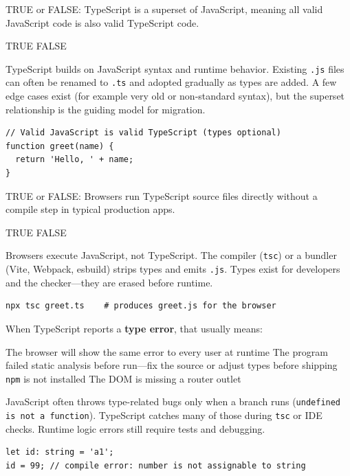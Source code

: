 


\question[4]
TRUE or FALSE: TypeScript is a superset of JavaScript, meaning all valid JavaScript code is also valid TypeScript code.
\begin{choices}
  \CorrectChoice TRUE
  \choice FALSE
\end{choices}
\begin{solution}
  TypeScript builds on JavaScript syntax and runtime behavior. Existing \texttt{.js} files can often be renamed to \texttt{.ts} and adopted gradually as types are added. A few edge cases exist (for example very old or non-standard syntax), but the superset relationship is the guiding model for migration.
\begin{lstlisting}[style=js]
// Valid JavaScript is valid TypeScript (types optional)
function greet(name) {
  return 'Hello, ' + name;
}
\end{lstlisting}
\end{solution}

\question[4]
TRUE or FALSE: Browsers run TypeScript source files directly without a compile step in typical production apps.
\begin{choices}
  \choice TRUE
  \CorrectChoice FALSE
\end{choices}
\begin{solution}
  Browsers execute JavaScript, not TypeScript. The compiler (\lstinline[style=bashinline]|tsc|) or a bundler (Vite, Webpack, esbuild) strips types and emits \texttt{.js}. Types exist for developers and the checker---they are erased before runtime.
\begin{lstlisting}[style=bash]
npx tsc greet.ts    # produces greet.js for the browser
\end{lstlisting}
\end{solution}

\question[4]
When TypeScript reports a \textbf{type error}, that usually means:
\begin{choices}
  \choice The browser will show the same error to every user at runtime
  \CorrectChoice The program failed static analysis before run---fix the source or adjust types before shipping
  \choice \texttt{npm} is not installed
  \choice The DOM is missing a router outlet
\end{choices}
\begin{solution}
  JavaScript often throws type-related bugs only when a branch runs (\lstinline[style=jsinline]|undefined is not a function|). TypeScript catches many of those during \lstinline[style=bashinline]|tsc| or IDE checks. Runtime logic errors still require tests and debugging.
\begin{lstlisting}[style=ts]
let id: string = 'a1';
id = 99; // compile error: number is not assignable to string
\end{lstlisting}
\end{solution}



